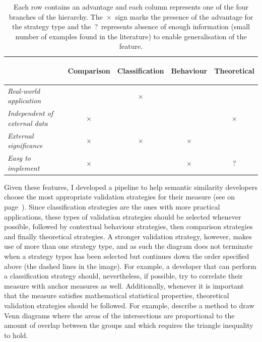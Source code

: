 \begin{table}
    \def\y{$\times$}
    \def\n{ }
    \def\?{?}
    \caption[Features of the several types of validation strategies]{Each row contains an advantage and each column represents one of the four branches of the hierarchy. The~\y\ sign marks the presence of the advantage for the strategy type and the~\?\ represents absence of enough information (small number of examples found in the literature) to enable generalisation of the feature.}
    \label{tab:features}
    \centering
    \small
    \begin{tabular}{lcccc}
    \toprule
    & \begin{turn}{90}\bfseries Comparison\end{turn}
    & \begin{turn}{90}\bfseries Classification\end{turn}
    & \begin{turn}{90}\bfseries Behaviour\end{turn}
    & \begin{turn}{90}\bfseries Theoretical\end{turn} \\
    \midrule
    \em Real-world application       & \n & \y & \n & \n \\
    \em Independent of external data & \y & \n & \n & \y \\
    \em External significance        & \y & \y & \y & \n \\
    \em Easy to implement            & \y & \n & \y & \? \\
    \bottomrule
    \end{tabular}
\end{table}

Given these features, I developed a pipeline to help semantic similarity developers choose the most appropriate validation strategies for their measure (see  on page~\pageref{fig:diagram}). Since classification strategies are the ones with more practical applications, these types of validation strategies should be selected whenever possible, followed by contextual behaviour strategies, then comparison strategies and finally theoretical strategies. A stronger validation strategy, however, makes use of more than one strategy type, and as such the diagram does not terminate when a strategy types has been selected but continues down the order specified above (\cf the dashed lines in the image). For example, a developer that can perform a classification strategy should, nevertheless, if possible, try to correlate their measure with anchor measures as well. Additionally, whenever it is important that the measure satisfies mathematical \andor statistical properties, theoretical validation strategies should be followed. For example, \citet{Chow2005} describe a method to draw Venn diagrams where the areas of the intersections are proportional to the amount of overlap between the groups and which requires the triangle inequality to hold.

